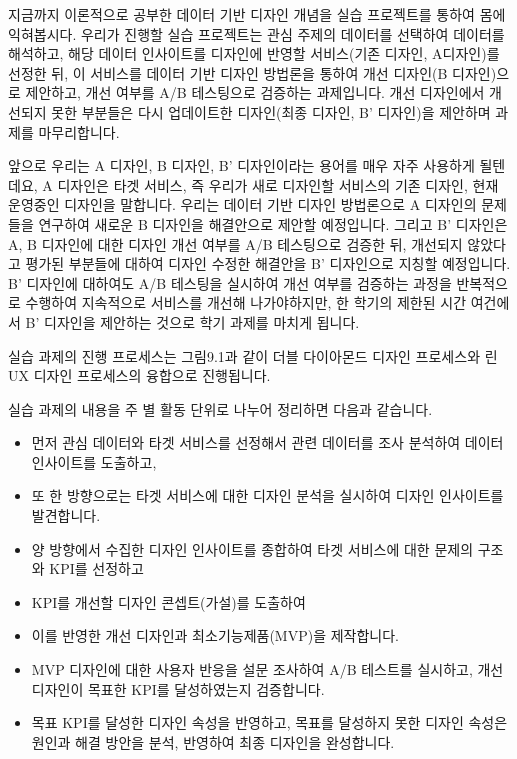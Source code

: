 \documentclass[
  letterpaper,
]{book}
\providecommand{\tightlist}{%
  \setlength{\itemsep}{0pt}\setlength{\parskip}{0pt}}\usepackage{longtable,booktabs,array}
\begin{document}
지금까지 이론적으로 공부한 데이터 기반 디자인 개념을 실습 프로젝트를
통하여 몸에 익혀봅시다. 우리가 진행할 실습 프로젝트는 관심 주제의
데이터를 선택하여 데이터를 해석하고, 해당 데이터 인사이트를 디자인에
반영할 서비스(기존 디자인, A디자인)를 선정한 뒤, 이 서비스를 데이터 기반
디자인 방법론을 통하여 개선 디자인(B 디자인)으로 제안하고, 개선 여부를
A/B 테스팅으로 검증하는 과제입니다. 개선 디자인에서 개선되지 못한
부분들은 다시 업데이트한 디자인(최종 디자인, B' 디자인)을 제안하며
과제를 마무리합니다.

앞으로 우리는 A 디자인, B 디자인, B' 디자인이라는 용어를 매우 자주
사용하게 될텐데요, A 디자인은 타겟 서비스, 즉 우리가 새로 디자인할
서비스의 기존 디자인, 현재 운영중인 디자인을 말합니다. 우리는 데이터
기반 디자인 방법론으로 A 디자인의 문제들을 연구하여 새로운 B 디자인을
해결안으로 제안할 예정입니다. 그리고 B' 디자인은 A, B 디자인에 대한
디자인 개선 여부를 A/B 테스팅으로 검증한 뒤, 개선되지 않았다고 평가된
부분들에 대하여 디자인 수정한 해결안을 B' 디자인으로 지칭할 예정입니다.
B' 디자인에 대하여도 A/B 테스팅을 실시하여 개선 여부를 검증하는 과정을
반복적으로 수행하여 지속적으로 서비스를 개선해 나가야하지만, 한 학기의
제한된 시간 여건에서 B' 디자인을 제안하는 것으로 학기 과제를 마치게
됩니다.

실습 과제의 진행 프로세스는 그림9.1과 같이 더블 다이아몬드 디자인
프로세스와 린 UX 디자인 프로세스의 융합으로 진행됩니다.

실습 과제의 내용을 주 별 활동 단위로 나누어 정리하면 다음과 같습니다.

\begin{itemize}
\tightlist
\item
  먼저 관심 데이터와 타겟 서비스를 선정해서 관련 데이터를 조사 분석하여
  데이터 인사이트를 도출하고,
\item
  또 한 방향으로는 타겟 서비스에 대한 디자인 분석을 실시하여 디자인
  인사이트를 발견합니다.
\item
  양 방향에서 수집한 디자인 인사이트를 종합하여 타겟 서비스에 대한
  문제의 구조와 KPI를 선정하고
\item
  KPI를 개선할 디자인 콘셉트(가설)를 도출하여
\item
  이를 반영한 개선 디자인과 최소기능제품(MVP)을 제작합니다.
\item
  MVP 디자인에 대한 사용자 반응을 설문 조사하여 A/B 테스트를 실시하고,
  개선 디자인이 목표한 KPI를 달성하였는지 검증합니다.
\item
  목표 KPI를 달성한 디자인 속성을 반영하고, 목표를 달성하지 못한 디자인
  속성은 원인과 해결 방안을 분석, 반영하여 최종 디자인을 완성합니다.
\end{itemize}
\end{document}
